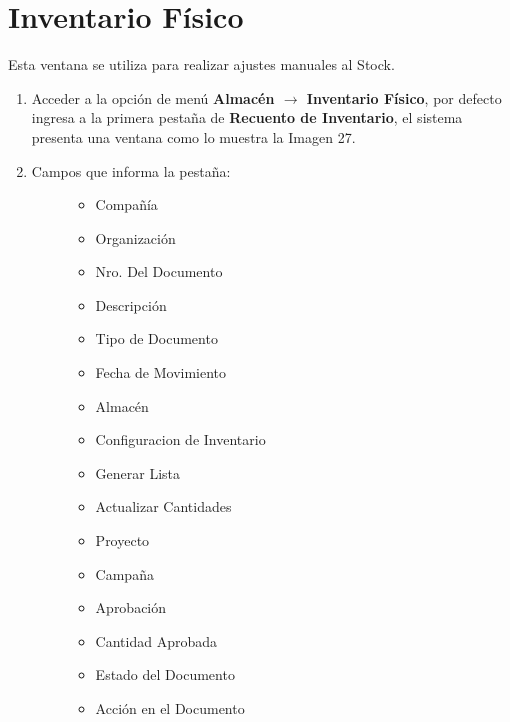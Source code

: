 \documentclass[letterpaper,10pt,spanish]{sphinxmanual}
\begin{document}
\section{Inventario Físico}
\label{stock:inventario-fisico}
Esta ventana se utiliza para realizar ajustes manuales al Stock.
\begin{enumerate}
\item {} 
Acceder a la opción de menú \textbf{Almacén \(\rightarrow\) Inventario Físico}, por defecto ingresa a la primera pestaña de \textbf{Recuento de Inventario}, el sistema presenta una ventana como lo muestra la Imagen 27.

\item {} \begin{description}
\item[{Campos que informa la pestaña:}] \leavevmode\begin{itemize}
\item {} 
Compañía

\item {} 
Organización

\item {} 
Nro. Del Documento

\item {} 
Descripción

\item {} 
Tipo de Documento

\item {} 
Fecha de Movimiento

\item {} 
Almacén

\item {} 
Configuracion de Inventario

\item {} 
Generar Lista

\item {} 
Actualizar Cantidades

\item {} 
Proyecto

\item {} 
Campaña

\item {} 
Aprobación

\item {} 
Cantidad Aprobada

\item {} 
Estado del Documento

\item {} 
Acción en el Documento


\end{itemize}
\end{description}
\end{enumerate}
\end{document}
